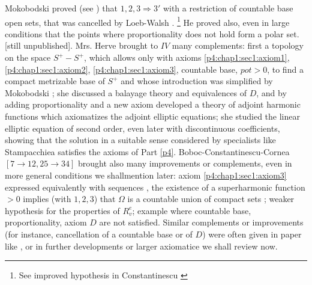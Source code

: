 Mokobodski proved (see \cite{21}) that $1,2,3 \Rightarrow 3'$ with a
restriction of countable base open sets, that was cancelled by
Loeb-Walsh \cite{53}. \footnote {See improved hypothesis in
  Constantinescu \cite{31}} He proved also, even in large conditions that
the points where proportionality does not hold form a polar
set. [still unpublished]. Mrs. Herve \cite{44} brought to $IV$ many
complements: first a topology on the space $S^+-S^+$, which allows
only with axioms \ref{p4:chap1:sec1:axiom1},
\ref{p4:chap1:sec1:axiom2}, \ref{p4:chap1:sec1:axiom3}, countable
base, $pot>0$, to find a compact 
metrizable base of $S^+$ and whose introduction was simplified by
Mokobodski \cite{60}; she discussed a balayage theory  and equivalences of
$D$, and by adding proportionality and a new axiom developed a theory
of adjoint harmonic functions which axiomatizes the adjoint elliptic
equations; she studied the linear elliptic equation of second order,
even later \cite{47} with discontinuous coefficients, showing that the
solution in a suitable sense considered by specialists like
Stampacchiea satisfies the axioms of Part
\ref{p4}. Boboc-Constantinescu-Cornea $[7\to 12,25 \to 34]$ brought also
many improvements or complements, even in more general conditions we
shall\pageoriginale mention later: axiom \ref{p4:chap1:sec1:axiom3} expressed
equivalently with sequences 
\cite{32}, the existence of a superharmonic function $>0$ implies (with
$1,2,3$) that $\Omega$ is a countable union of compact sets \cite{34};
weaker hypothesis for the properties of $R^e_v$; example where
countable base, proportionality, axiom $D$ are not satisfied. Similar
complements or improvements (for instance, cancellation of a countable
base or of $D$) were often given in paper like \cite{24}, \cite{49} or in
further developments or larger axiomatice we shall review now. 

